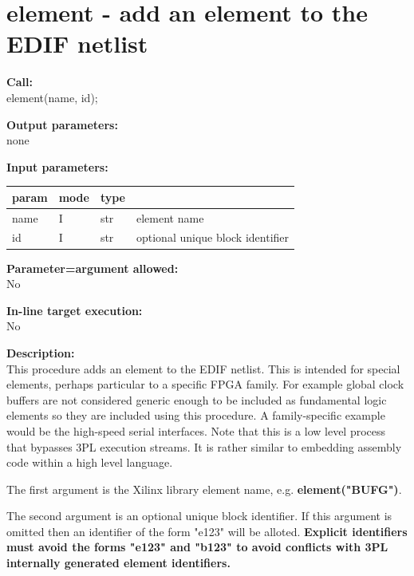     \section{element - add an element to the EDIF netlist}\label{sec:ipelement}
        
        {\bf Call:} \\
        element(name, id);
        
        {\bf Output parameters:} \\
        none
        
        {\bf Input parameters:} \\
        \begin{tabular}{| l | l | l | l |}
        \hline
        param  & mode     & type  & \\
        \hline \hline
        name & I & str & element name                     \\ \hline
        id   & I & str & optional unique block identifier \\ \hline
        \end{tabular}
        
        {\bf Parameter=argument allowed:} \\
        No
        
        {\bf In-line target execution:} \\
        No
        
        {\bf Description:} \\
        This procedure adds an element to the EDIF netlist. This is intended for
        special elements, perhaps particular to a specific FPGA family. For
        example global clock buffers are not considered generic enough to be
        included as fundamental logic elements so they are included using this
        procedure. A family-specific example would be the high-speed serial
        interfaces. Note that this is a low level process that bypasses 3PL
        execution streams. It is rather similar to embedding assembly code within
        a high level language.
        
        The first argument is the Xilinx library element name, e.g.
        {\bf element("BUFG")}.
        
        The second argument is an optional unique block identifier. If this
        argument is omitted then an identifier of the form "e123" will be alloted.
        {\bf Explicit identifiers must avoid the forms "e123" and "b123" to avoid
        conflicts with 3PL internally generated element identifiers.}
        
